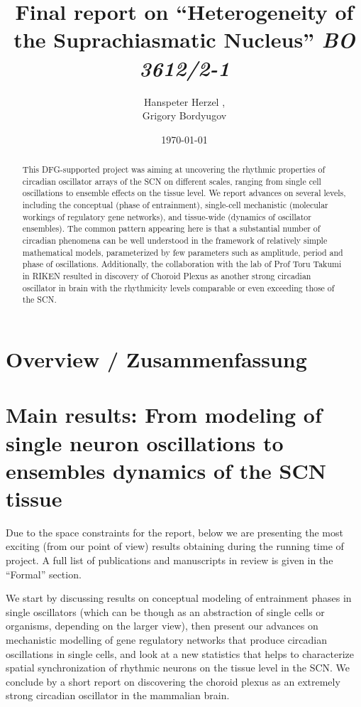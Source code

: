 \documentclass[a4paper]{article}
\title{Final report on ``Heterogeneity of the Suprachiasmatic
Nucleus'' {\em BO 3612/2-1}}
\author{Hanspeter Herzel  \mailhref{h.herzel@biologie.hu-berlin.de},\\
        Grigory Bordyugov \mailhref{grigory.bordyugov@gmail.com}}
\date{\today}
\begin{document}
\maketitle

\thispagestyle{empty}

\begin{abstract}
  This DFG-supported project was aiming at uncovering the rhythmic
  properties of circadian oscillator arrays of the SCN on different
  scales, ranging from single cell oscillations to ensemble effects on
  the tissue level. We report advances on several levels, including
  the conceptual (phase of entrainment), single-cell mechanistic
  (molecular workings of regulatory gene networks), and tissue-wide
  (dynamics of oscillator ensembles). The common pattern appearing
  here is that a substantial number of circadian phenomena can be well
  understood in the framework of relatively simple mathematical
  models, parameterized by few parameters such as amplitude, period
  and phase of oscillations. Additionally, the collaboration with the
  lab of Prof Toru Takumi in RIKEN resulted in discovery of Choroid
  Plexus as another strong circadian oscillator in brain with the
  rhythmicity levels comparable or even exceeding those of the SCN.
\end{abstract}


\newpage

\section{Overview / Zusammenfassung}


\newpage

\section{Main results: From modeling of single neuron oscillations to
ensembles dynamics of the SCN tissue}
Due to the space constraints for the report, below we are presenting
the most exciting (from our point of view) results obtaining during
the running time of project. A full list of publications and
manuscripts in review is given in the ``Formal'' section.

We start by discussing results on conceptual modeling of entrainment
phases in single oscillators (which can be though as an abstraction of
single cells or organisms, depending on the larger view), then present
our advances on mechanistic modelling of gene regulatory networks that
produce circadian oscillations in single cells, and look at a new
statistics that helps to characterize spatial synchronization of
rhythmic neurons on the tissue level in the SCN. We conclude by a
short report on discovering the choroid plexus as an extremely strong
circadian oscillator in the mammalian brain.
\end{document}
